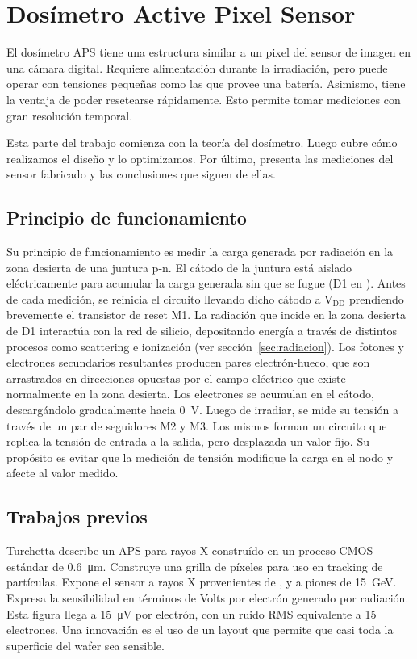 \section{Dosímetro Active Pixel Sensor}
El dosímetro APS tiene una estructura similar a 
un pixel del sensor de imagen en una cámara digital. 
Requiere alimentación durante la irradiación,
pero puede operar con tensiones pequeñas
como las que provee una batería.
Asimismo, tiene la ventaja de poder resetearse rápidamente.
Esto permite tomar mediciones con gran resolución temporal.

Esta parte del trabajo comienza con la teoría del dosímetro.
Luego cubre cómo realizamos el diseño y lo optimizamos.
Por último, presenta las mediciones del sensor fabricado 
y las conclusiones que siguen de ellas.
%
\subsection{Principio de funcionamiento}
%
Su principio de funcionamiento es medir 
la carga generada por radiación 
en la zona desierta de una juntura p-n.
El cátodo de la juntura está aislado eléctricamente 
para acumular la carga generada sin que se fugue
(D1 en ).
Antes de cada medición, se reinicia el circuito llevando dicho cátodo a
V$_{\text{DD}}$ prendiendo brevemente el transistor de reset M1.
La radiación que incide en la zona desierta de D1 interactúa con la red de
silicio, depositando energía a través de distintos procesos como scattering e
ionización (ver sección~\ref{sec:radiacion}).
Los fotones y electrones secundarios resultantes producen pares electrón-hueco,
que son arrastrados en direcciones opuestas por el campo eléctrico
que existe normalmente en la zona desierta.
Los electrones se acumulan en el cátodo,
descargándolo gradualmente hacia \SI{0}{\volt}.
Luego de irradiar,
se mide su tensión a través de un par de seguidores M2 y M3.
Los mismos forman un circuito que replica la tensión de entrada a la salida,
pero desplazada un valor fijo.
Su propósito es evitar que la medición de tensión modifique la carga en el nodo y
afecte al valor medido.
\subsection{Trabajos previos}
Turchetta\cite{turchetta_monolithic_2001} describe un APS para rayos X
construído en un proceso CMOS estándar de \SI{0.6}{\micro\meter}. 
Construye una grilla de píxeles para uso en tracking de partículas.
Expone el sensor a rayos X provenientes de ,
y a piones de \SI{15}{\giga\electronvolt}.
Expresa la sensibilidad en términos de Volts por electrón generado por
radiación. Esta figura llega a \SI{15}{\micro\volt} por electrón,
con un ruido RMS equivalente a 15 electrones.
Una innovación es el uso de un layout que permite que casi toda la superficie
del wafer sea sensible.

